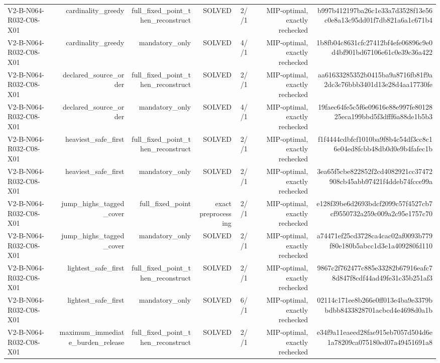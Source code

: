 {\begin{longtable}{lrrrrrr}
V2-B-N064-R032-C08-X01 & cardinality\_greedy & full\_fixed\_point\_then\_reconstruct & SOLVED & 2//1 & MIP-optimal, exactly rechecked & b997b412197ba26c1e33a7d3528f13e56c0e8a13c95dd01f7db821a6a1c671b4 \\
V2-B-N064-R032-C08-X01 & cardinality\_greedy & mandatory\_only & SOLVED & 4//1 & MIP-optimal, exactly rechecked & 1b8fb04c8631cfc27412bf4efe06896c9e0d4bf901bd67106e61c0e39c36a422 \\
V2-B-N064-R032-C08-X01 & declared\_source\_order & full\_fixed\_point\_then\_reconstruct & SOLVED & 2//1 & MIP-optimal, exactly rechecked & aa61633285352b0415ba9a8716fb81f9a2dc3c76bbb3401d13e28d4aa17730fe \\
V2-B-N064-R032-C08-X01 & declared\_source\_order & mandatory\_only & SOLVED & 4//1 & MIP-optimal, exactly rechecked & 19faec64fe5c5f6e09616e88e997fe8012825eca199bbd5f3dfff6a88de1b5b3 \\
V2-B-N064-R032-C08-X01 & heaviest\_safe\_first & full\_fixed\_point\_then\_reconstruct & SOLVED & 2//1 & MIP-optimal, exactly rechecked & f1f4444cdbfcf1010ba9f8b4c54df3cc8c16e04ed8fcbb48db0d0e9b4fafec1b \\
V2-B-N064-R032-C08-X01 & heaviest\_safe\_first & mandatory\_only & SOLVED & 2//1 & MIP-optimal, exactly rechecked & 3ea65f5cbe822852f2cd4082921cc37472908cb45abb97421f4ddeb74fcce99a \\
V2-B-N064-R032-C08-X01 & jump\_highs\_tagged\_cover & full\_fixed\_point & exact preprocessing & 2//1 & MIP-optimal, exactly rechecked & e128f39be6d2693bdcf2099c57f4527cb7cf9550732a259c009a2c95e1757c70 \\
V2-B-N064-R032-C08-X01 & jump\_highs\_tagged\_cover & mandatory\_only & SOLVED & 2//1 & MIP-optimal, exactly rechecked & a74471ef25cd3728ca4cac02af0093b779f80e180b5abcc1d3e1a409280fd110 \\
V2-B-N064-R032-C08-X01 & lightest\_safe\_first & full\_fixed\_point\_then\_reconstruct & SOLVED & 2//1 & MIP-optimal, exactly rechecked & 9867c2f762477c885e33282b67916eafc78d847f8cdf44ad49fe31c35b251af3 \\
V2-B-N064-R032-C08-X01 & lightest\_safe\_first & mandatory\_only & SOLVED & 6//1 & MIP-optimal, exactly rechecked & 02114c171ee8b266e0ff013e4ba9e3379bbdbb8433828701acbcd4e4698d0a1b \\
V2-B-N064-R032-C08-X01 & maximum\_immediate\_burden\_release & full\_fixed\_point\_then\_reconstruct & SOLVED & 2//1 & MIP-optimal, exactly rechecked & e34f9a11eaeed28fae915eb7057d504d6e1a78209ca075180ed07a49451691a8 \\

\end{longtable}}
